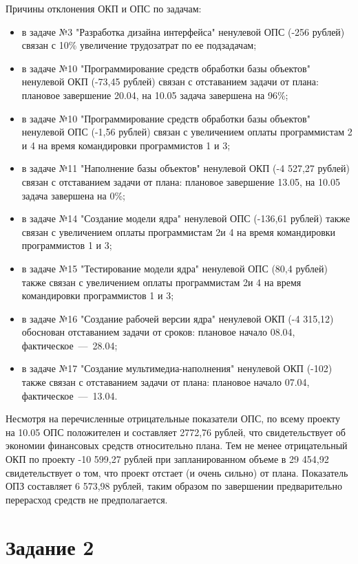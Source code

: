 Причины отклонения ОКП и ОПС по задачам:
\begin{itemize}
	\item в задаче №3 "Разработка дизайна интерфейса" ненулевой ОПС (-256 рублей) связан с 10\% увеличение трудозатрат по ее подзадачам;
	\item в задаче №10 "Программирование средств обработки базы объектов" ненулевой ОКП (-73,45 рублей) связан с отставанием задачи от плана: плановое завершение 20.04, на 10.05 задача завершена на 96\%;
	\item в задаче №10 "Программирование средств обработки базы объектов" ненулевой ОПС (-1,56 рублей) связан с увеличением оплаты программистам 2 и 4 на время командировки программистов 1 и 3;
	\item в задаче №11 "Наполнение базы объектов" ненулевой ОКП (-4 527,27 рублей) связан с отставанием задачи от плана: плановое завершение 13.05, на 10.05 задача завершена на 0\%;
	\item в задаче №14 "Создание модели ядра" ненулевой ОПС (-136,61 рублей) также связан с увеличением оплаты программистам 2и 4 на время командировки программистов 1 и 3;
	\item в задаче №15 "Тестирование модели ядра" ненулевой ОПС (80,4 рублей) также связан с увеличением оплаты программистам 2и 4 на время командировки программистов 1 и 3;
	\item в задаче №16 "Создание рабочей версии ядра" ненулевой ОКП (-4 315,12) обоснован отставанием задачи от сроков: плановое начало 08.04, фактическое~---~28.04;
	\item в задаче №17 "Создание мультимедиа-наполнения" ненулевой ОКП (-102) также связан с отставанием задачи от плана: плановое начало 07.04, фактическое~---~13.04.
\end{itemize}

Несмотря на перечисленные отрицательные показатели ОПС, по всему проекту на 10.05 ОПС положителен и составляет 2772,76 рублей, что свидетельствует об экономии финансовых средств относительно плана. Тем не менее отрицательный ОКП по проекту -10 599,27 рублей при запланированном объеме в 29 454,92 свидетельствует о том, что проект отстает (и очень сильно) от плана. Показатель ОПЗ составляет 6 573,98 рублей, таким образом по завершении предварительно перерасход средств не предполагается.

\section{Задание 2}

